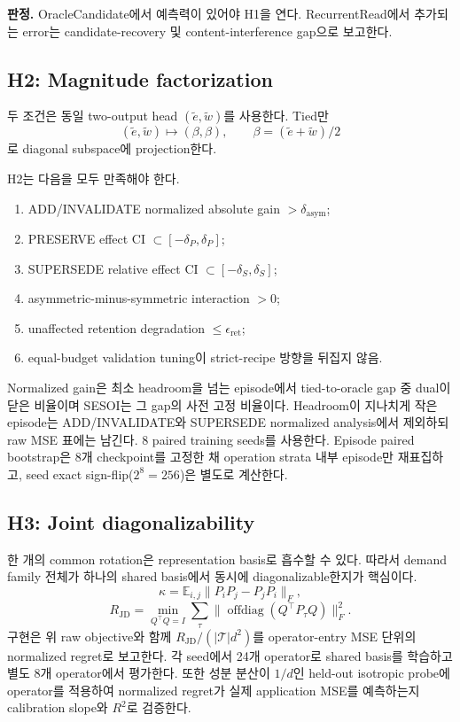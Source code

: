 \documentclass[10.5pt,a4paper]{article}
\newcommand{\E}{\mathbb{E}}
\begin{document}
\textbf{판정.} OracleCandidate에서 예측력이 있어야 H1을 연다. RecurrentRead에서 추가되는 error는 candidate-recovery 및 content-interference gap으로 보고한다.

\subsection{H2: Magnitude factorization}
두 조건은 동일 two-output head $(\tilde e,\tilde w)$를 사용한다. Tied만
\[
(\tilde e,\tilde w)\mapsto(\beta,\beta),\qquad
\beta=(\tilde e+\tilde w)/2
\]
로 diagonal subspace에 projection한다.

H2는 다음을 모두 만족해야 한다.
\begin{enumerate}
\item ADD/INVALIDATE normalized absolute gain $>\delta_{\mathrm{asym}}$;
\item PRESERVE effect CI $\subset[-\delta_P,\delta_P]$;
\item SUPERSEDE relative effect CI $\subset[-\delta_S,\delta_S]$;
\item asymmetric-minus-symmetric interaction $>0$;
\item unaffected retention degradation $\le\epsilon_{\mathrm{ret}}$;
\item equal-budget validation tuning이 strict-recipe 방향을 뒤집지 않음.
\end{enumerate}

Normalized gain은 최소 headroom을 넘는 episode에서 tied-to-oracle gap 중 dual이 닫은 비율이며 SESOI는 그 gap의 사전 고정 비율이다. Headroom이 지나치게 작은 episode는 ADD/INVALIDATE와 SUPERSEDE normalized analysis에서 제외하되 raw MSE 표에는 남긴다. 8 paired training seeds를 사용한다. Episode paired bootstrap은 8개 checkpoint를 고정한 채 operation strata 내부 episode만 재표집하고, seed exact sign-flip($2^8=256$)은 별도로 계산한다.

\subsection{H3: Joint diagonalizability}
한 개의 common rotation은 representation basis로 흡수할 수 있다. 따라서 demand family 전체가 하나의 shared basis에서 동시에 diagonalizable한지가 핵심이다.
\[
\kappa=\E_{i,j}\|P_iP_j-P_jP_i\|_F,
\]
\[
R_{\mathrm{JD}}=
\min_{Q^\top Q=I}
\sum_\tau\|\operatorname{offdiag}(Q^\top P_\tau Q)\|_F^2.
\]
구현은 위 raw objective와 함께
$R_{\mathrm{JD}}/(|\mathcal{T}|d^2)$를 operator-entry MSE 단위의 normalized
regret로 보고한다. 각 seed에서 24개 operator로 shared basis를 학습하고 별도
8개 operator에서 평가한다. 또한 성분 분산이 $1/d$인 held-out isotropic probe에
operator를 적용하여 normalized regret가 실제 application MSE를 예측하는지
calibration slope와 $R^2$로 검증한다.
\end{document}
